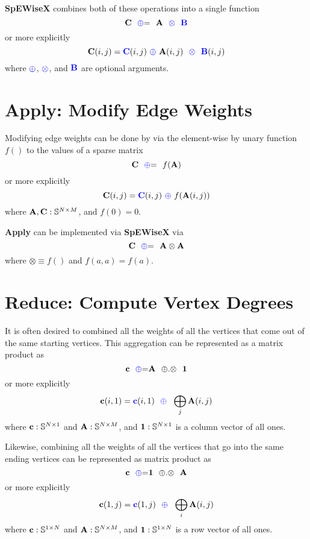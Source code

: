   {\bf SpEWiseX} combines both of these operations into a single function
$$
   {\bf C} ~~ {\textcolor{blue}{\oplus}}{=} ~~ {\bf A} ~~ {\textcolor{blue}{\otimes}} ~~ {\textcolor{blue}{\bf B}}
$$
or more explicitly
$$
   {\bf C}(i,j) = {\textcolor{blue}{\bf C}}(i,j) ~ {\textcolor{blue}{\oplus}} ~ {\bf A}(i,j) ~~ {\textcolor{blue}{\otimes}} ~~ {\textcolor{blue}{\bf B}}(i,j)
$$
where ${\textcolor{blue}{\oplus}}$, ${\textcolor{blue}{\otimes}}$, and ${\textcolor{blue}{\bf B}}$ are optional arguments. 

\section{Apply: Modify Edge Weights}
  Modifying edge weights can be done by via the element-wise by unary function $f()$ to the values of a sparse matrix
$$
   {\bf C} ~~ {\textcolor{blue}{\oplus}}{=} ~~ f({\bf A})
$$
or more explicitly
$$
   {\bf C}(i,j) = {\textcolor{blue}{\bf C}}(i,j) ~ {\textcolor{blue}{\oplus}} ~f({\bf A}(i,j))
$$
where ${\bf A},{\bf C}: \mathbb{S}^{N \times M}$, and $f(0) = 0$.

  {\bf Apply} can be implemented via {\bf SpEWiseX} via
$$
   {\bf C} ~~ {\textcolor{blue}{\oplus}}{=} ~~ {\bf A} \otimes {\bf A}
$$
where $\otimes \equiv f()$ and $f(a,a) = f(a)$.

\section{Reduce: Compute Vertex Degrees}
  It is often desired to combined all the weights of all the vertices that come out of the same starting vertices.  This aggregation can be represented as a matrix product as
$$
   {\bf c} ~~ {\textcolor{blue}{\oplus}}{=} {\bf A} ~~ {\oplus}.{\otimes} ~~{\bf 1}
$$
or more explicitly
$$
   {\bf c}(i,1) = {\textcolor{blue}{\bf c}}(i,1) ~~ {\textcolor{blue}{\oplus}} ~~ \bigoplus_{j} {\bf A}(i,j)
$$
where ${\bf c}: \mathbb{S}^{N \times 1}$ and ${\bf A}: \mathbb{S}^{N \times M}$, and ${\bf 1}: \mathbb{S}^{N \times 1}$ is a column vector of all ones.

Likewise, combining all the weights of all the vertices that go into the same ending vertices can be represented as matrix product as
$$
   {\bf c} ~~ {\textcolor{blue}{\oplus}}{=}  {\bf 1} ~~ {\oplus}.{\otimes} ~~{\bf A} 
$$
or more explicitly
$$
   {\bf c}(1,j) = {\textcolor{blue}{\bf c}}(1,j) ~~ {\textcolor{blue}{\oplus}} ~~ \bigoplus_{i} {\bf A}(i,j)
$$
where ${\bf c}: \mathbb{S}^{1 \times N}$ and ${\bf A}: \mathbb{S}^{N \times M}$, and ${\bf 1}: \mathbb{S}^{1 \times N}$ is a row vector of all ones.


